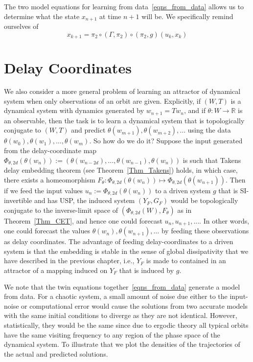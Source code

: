\documentclass[a4paper,12pt,twoside]{report}
\begin{document}
The two model equations for learning from data~\eqref{eqns_from_data} allows us to determine what the state $x_{n+1}$ at time $n+1$ will be. 
We specifically remind ourselves of \[x_{k+1}=\pi_2 \circ (\Gamma, \pi_2) \circ (\pi_2,g) (u_k,x_k)\]

\section{Delay Coordinates}

We also consider a more general problem of learning an attractor of dynamical system when only observations of an orbit are given. Explicitly, if $(W,T)$ is a dynamical system with dynamics generated by $w_{n+1}=Tw_n$, and if $\theta:W \to \mathbb{R}$ is an observable, then the task is to learn a dynamical system that is topologically conjugate to $(W,T)$ and predict $\theta(w_{m+1}),\theta(w_{m+2}),...$ using the data $\theta(w_{0}),\theta(w_{1}),\ldots,\theta(w_{m})$.  So how do we do it?
Suppose the input generated from the delay-coordinate map $\Phi_{\theta,2d}(\theta(w_{n})) := (\theta(w_{n-2d}),\ldots,\theta(w_{n-1}),\theta(w_{n}))$ is such that Takens delay embedding theorem (see Theorem~\ref{Thm_Takens}) holds, in which case, there exists a homeomorphism  $F_\theta: \Phi_{\theta,2d}(\theta(w_{n})) \mapsto \Phi_{\theta,2d}(\theta(w_{n+1}))$. Then if we feed  the input values $u_n := \Phi_{\theta,2d}(\theta(w_{n}))$ to a driven system $g$ that is SI-invertible and has USP, the induced system $(Y_F,G_F)$ would be topologically conjugate to the inverse-limit space of
$(\Phi_{\theta,2d}(W), F_\theta)$ as in Theorem~\ref{Thm_CET}, and hence one could forecast $u_n,u_{n+1},\ldots$. In other words, one could forecast  the values $\theta(w_n), \theta(w_{n+1}),\ldots$ by feeding these observations as delay coordinates. The advantage of feeding delay-coordinates to a driven system is that the embedding is stable in the sense of global dissipativity that we have described in the previous chapter, i.e., $Y_F$ is made to contained in an attractor of a mapping induced on $Y_F$ that is induced by $g$. 

We note that the twin equations together~\ref{eqns_from_data} generate a model from data. For a chaotic system, a small amount of noise due either to the input-noise or computational error would cause the solutions from two accurate models with the same initial conditions to  diverge as they are not identical.  However, statistically, they would be the same since due to ergodic theory all typical orbits have the same visiting frequency to any region of the phase space of the dynamical system.  To illustrate that we plot the densities of the trajectories of the actual and predicted solutions. 
\end{document}
